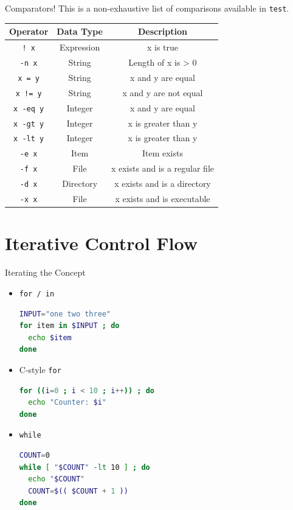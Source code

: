 \documentclass[11pt]{beamer}
\begin{document}
\begin{frame}[fragile=singleslide]{Comparators!}
This is a non-exhaustive list of comparisons available in \texttt{test}.
\center
\begin{tabular}{| c | c | c |}
\hline
Operator & Data Type & Description \\ \hline \hline
\texttt{! x} & Expression & x is true \\ \hline \hline
\texttt{-n x} & String & Length of x is > 0 \\ \hline
\texttt{x = y} & String & x and y are equal \\ \hline
\texttt{x != y} & String & x and y are not equal \\ \hline \hline
\texttt{x -eq y} & Integer & x and y are equal \\ \hline
\texttt{x -gt y} & Integer & x is greater than y \\ \hline
\texttt{x -lt y} & Integer & x is greater than y \\ \hline \hline
\texttt{-e x} & Item & Item exists \\ \hline \hline
\texttt{-f x} & File & x exists and is a regular file \\ \hline
\texttt{-d x} & Directory & x exists and is a directory \\ \hline
\texttt{-x x} & File & x exists and is executable \\ \hline
\end{tabular}

\end{frame}

\section[Loops]{Iterative Control Flow}
\begin{frame}[fragile=singleslide]{Iterating the Concept}
\begin{itemize}
\item \texttt{for / in}
\begin{lstlisting}[style=terminal, language=bash]
INPUT="one two three"
for item in $INPUT ; do
  echo $item
done
\end{lstlisting}
\item C-style \texttt{for}
\begin{lstlisting}[style=terminal, language=bash]
for ((i=0 ; i < 10 ; i++)) ; do
  echo "Counter: $i"
done
\end{lstlisting}
\item \texttt{while}
\begin{lstlisting}[style=terminal, language=bash]
COUNT=0
while [ "$COUNT" -lt 10 ] ; do
  echo "$COUNT"
  COUNT=$(( $COUNT + 1 ))
done
\end{lstlisting}
\end{itemize}
\end{frame}
\end{document}
